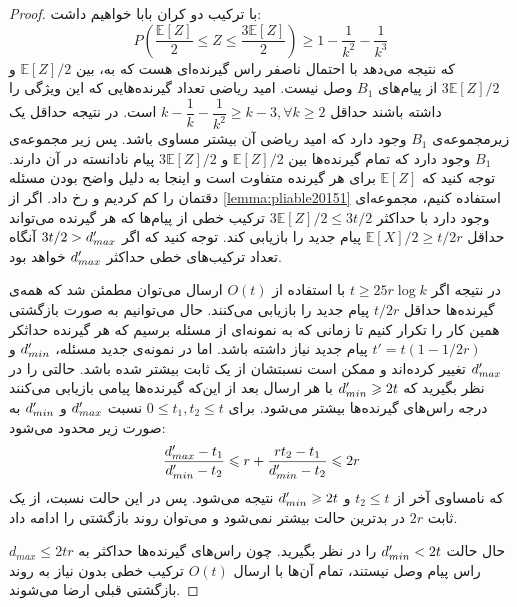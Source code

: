 \begin{proof}
    با ترکیب دو کران بابا خواهیم داشت:
    \begin{equation}
        P(\dfrac{\mathbb{E}[Z]}{2} \leq Z \leq \dfrac{3\mathbb{E}[Z]}{2}) \geq 1 - \dfrac{1}{k^2} - \dfrac{1}{k^3}
    \end{equation}
    که نتیجه می‌دهد با احتمال ناصفر راس گیرنده‌ای هست که به، بین
    $\mathbb{E}[Z]/2$
    و
    $3\mathbb{E}[Z]/2$
    از پیام‌های
    $B_1$
    وصل نیست. امید ریاضی تعداد گیرنده‌هایی که این ویژگی را داشته باشند حداقل
    $k - \dfrac{1}{k} - \dfrac{1}{k^2} \geq k - 3, \forall k \geq 2$
    است. در نتیجه حداقل یک زیرمجموعه‌ی
    $B_1$
    وجود دارد که امید ریاضی آن بیشتر مساوی باشد. پس زیر مجموعه‌ی
    $B_1$
    وجود دارد که تمام گیرنده‌ها بین
    $\mathbb{E}[Z] / 2$
    و
    $3\mathbb{E}[Z]/2$
    پیام نادانسته در آن دارند. توجه کنید که
    $\mathbb{E}[Z]$
    برای هر گیرنده متفاوت است و اینجا به دلیل واضح بودن مسئله دقتمان را کم کردیم و
    رخ داد. اگر از
    \autoref{lemma:pliable20151}
    استفاده کنیم، مجموعه‌ای وجود دارد با حداکثر
    $3\mathbb{E}[Z]/2 \leq 3t/2$
    ترکیب خطی از پیام‌ها که هر گیرنده می‌تواند حداقل
    $\mathbb{E}[X]/2 \geq t/2r$
    پیام جدید را بازیابی کند. توجه کنید که اگر
    $3t/2 > d_{max}'$
    آنگاه تعداد ترکیب‌های خطی حداکثر
    $d_{max}'$
    خواهد بود.

    در نتیجه اگر
    $t \geq 25 r \log k$
    با استفاده از
    $O(t)$
    ارسال می‌توان مطمئن شد که همه‌ی گیرنده‌ها حداقل
    $t/2r$
    پیام جدید را بازیابی می‌کنند. حال می‌توانیم به صورت بازگشتی همین کار را تکرار کنیم تا زمانی که به نمونه‌ای از مسئله برسیم که هر گیرنده حداثکر
    $t' = t(1 - 1/2r)$
    پیام جدید نیاز داشته باشد. اما در نمونه‌ی جدید مسئله،
    $d_{min}'$
    و
    $d_{max}'$
    تغییر کرده‌اند و ممکن است نسبتشان از یک ثابت بیشتر شده باشد. حالتی را در نظر بگیرید که
    $d_{min}' \geqslant 2t$
    با هر ارسال بعد از این‌که گیرنده‌ها پیامی بازیابی می‌کنند درجه راس‌های گیرنده‌ها بیشتر می‌شود. برای
    $0 \leq t_1, t_2 \leq t$
    نسبت
    $d_{max}'$
    و
    $d_{min}'$
    به صورت زیر محدود می‌شود:
    \begin{equation}
        \dfrac{d_{max}' - t_1}{d_{min}' - t_2} \leqslant r + \dfrac{rt_2 - t_1}{d_{min}' - t_2} \leqslant 2r
    \end{equation}
    که نامساوی آخر از
    $t_2 \leq t$
    و
    $d_{min}' \geqslant 2t$
    نتیجه می‌شود. پس در این حالت نسبت، از یک ثابت
    $2r$
    در بدترین حالت بیشتر نمی‌شود و می‌توان روند بازگشتی را ادامه داد.

    حال حالت
    $d_{min}' < 2t$
    را در نظر بگیرید. چون راس‌های گیرنده‌ها حداکثر به
    $d_{max} \leq 2tr$
    راس پیام وصل نیستند، تمام آن‌ها با ارسال
    $O(t)$
    ترکیب خطی بدون نیاز به روند بازگشتی قبلی ارضا می‌شوند.


\end{proof}
